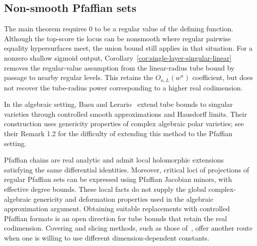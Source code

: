 \subsection{Non-smooth Pfaffian sets}\label{subsec:nonsmooth}
The main theorem requires $0$ to be a regular value of the defining function. Although the top-score tie locus can be nonsmooth where regular pairwise equality hypersurfaces meet, the union bound still applies in that situation. For a nonzero shallow sigmoid output, Corollary~\ref{cor:single-layer-singular-linear} removes the regular-value assumption from the linear-radius tube bound by passage to nearby regular levels. This retains the $O_{n,L}(w^n)$ coefficient, but does not recover the tube-radius power corresponding to a higher real codimension.

In the algebraic setting, Basu and Lerario~\cite{basu2021hausdorff} extend tube bounds to singular varieties through controlled smooth approximations and Hausdorff limits. Their construction uses genericity properties of complex algebraic polar varieties; see their Remark 1.2 for the difficulty of extending this method to the Pfaffian setting.

Pfaffian chains are real analytic and admit local holomorphic extensions satisfying the same differential identities. Moreover, critical loci of projections of regular Pfaffian sets can be expressed using Pfaffian Jacobian minors, with effective degree bounds. These local facts do not supply the global complex-algebraic genericity and deformation properties used in the algebraic approximation argument. Obtaining suitable replacements with controlled Pfaffian formats is an open direction for tube bounds that retain the real codimension. Covering and slicing methods, such as those of~\cite{zhang2025covering}, offer another route when one is willing to use different dimension-dependent constants.
